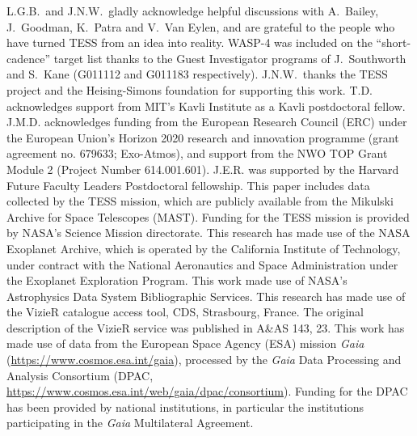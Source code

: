 \documentclass[12pt,twocolumn,tighten]{aastex62}
\begin{document}
\acknowledgements
L.G.B.\ and J.N.W.\ gladly acknowledge helpful discussions with
A.~Bailey, J.~Goodman, K.~Patra and V.~Van
Eylen, and are grateful to the people who have turned TESS from an
idea into reality.  
%
WASP-4 was included on the ``short-cadence'' target list thanks to the
Guest Investigator programs of J.\ Southworth and S.\ Kane (G011112
and G011183 respectively). 
%
J.N.W.\ thanks the TESS project and the Heising-Simons foundation for
supporting this work.
%
T.D. acknowledges support from MIT's Kavli Institute as a Kavli
postdoctoral fellow.
%
J.M.D. acknowledges funding from the European Research Council (ERC)
under the European Union's Horizon 2020 research and innovation
programme (grant agreement no. 679633; Exo-Atmos), and support from
the NWO TOP Grant Module 2 (Project Number 614.001.601).
%
J.E.R. was supported by the Harvard Future Faculty Leaders
Postdoctoral fellowship.
%
This paper includes data collected by the TESS mission, which are
publicly available from the Mikulski Archive for Space Telescopes
(MAST).
%
Funding for the TESS mission is provided by NASA's Science Mission
directorate.
%
This research has made use of the NASA Exoplanet Archive, which is
operated by the California Institute of Technology, under contract
with the National Aeronautics and Space Administration under the
Exoplanet Exploration Program.
%
This work made use of NASA's Astrophysics Data System Bibliographic
Services.
%
This research has made use of the VizieR catalogue access tool, CDS,
Strasbourg, France. The original description of the VizieR service was
published in A\&AS 143, 23.
%
This work has made use of data from the European Space Agency (ESA)
mission {\it Gaia} (\url{https://www.cosmos.esa.int/gaia}), processed
by the {\it Gaia} Data Processing and Analysis Consortium (DPAC,
\url{https://www.cosmos.esa.int/web/gaia/dpac/consortium}). Funding
for the DPAC has been provided by national institutions, in particular
the institutions participating in the {\it Gaia} Multilateral
Agreement.
%
\newline
%
%
\end{document}
